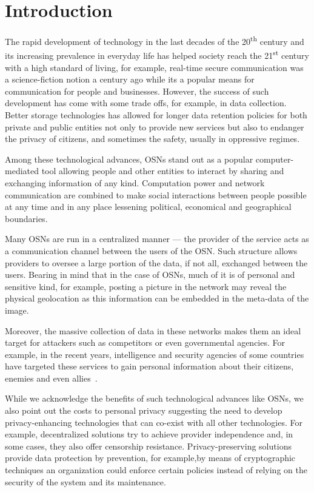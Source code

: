 \section{Introduction}
\label{Introduction}
The rapid development of technology in the last decades of the 20\textsuperscript{th} 
century and its increasing prevalence in everyday life has helped society reach 
the 21\textsuperscript{st} century with a high standard of living, for example, 
real-time secure communication was a science-fiction notion a century ago while 
its a popular means for communication for people and businesses. However, the success 
of such development has come with some trade offs, for example, in data collection.
Better storage technologies has allowed for longer data retention policies for both 
private and public entities not only to provide new services but also to endanger 
the privacy of citizens, and sometimes the safety, usually in oppressive regimes.

Among these technological advances, \acp{OSN} stand out as a popular computer-mediated 
tool allowing people and other entities to interact by sharing and exchanging information 
of any kind. Computation power and network communication are combined to make social 
interactions between people possible at any time and in any place lessening political, 
economical and geographical boundaries.

Many \acp{OSN} are run in a centralized manner --- the provider of the service acts 
as a communication channel between the users of the \ac{OSN}. Such structure allows 
providers to oversee a large portion of the data, if not all, exchanged between 
the users. Bearing in mind that in the case of \acp{OSN}, much of it is of personal 
and sensitive kind, for example, posting a picture in the network may reveal the 
physical geolocation as this information can be embedded in the meta-data of the 
image.

Moreover, the massive collection of data in these networks makes them an ideal target 
for attackers such as competitors or even governmental agencies. For example, in 
the recent years, intelligence and security agencies of some countries have targeted 
these services to gain personal information about their citizens, enemies and even 
allies~\cite{Prism}.

While we acknowledge the benefits of such technological advances like \acp{OSN}, 
we also point out the costs to personal privacy suggesting the need to develop privacy-enhancing 
technologies that can co-exist with all other technologies. For example, decentralized 
solutions try to achieve provider independence and, in some cases, they also offer 
censorship resistance. Privacy-preserving solutions provide data protection by prevention, 
for example,by means of cryptographic techniques an organization could enforce certain 
policies instead of relying on the security of the system and its maintenance.

